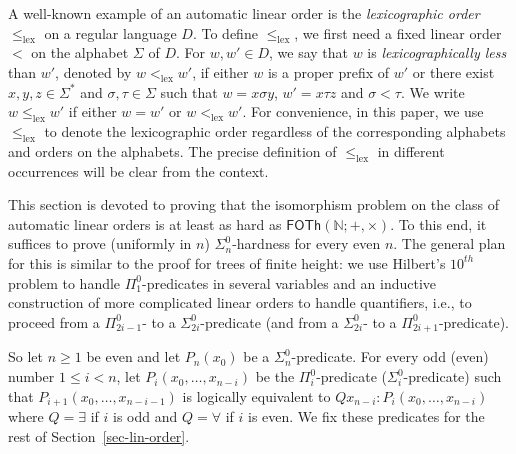 \documentclass[envcountsame]{llncs}
\newcommand{\FOTh}{\mathsf{FOTh}}
\newcommand{\lex}{\mathrm{lex}}
\newcommand{\N}{\mathbb N}
\begin{document}
A well-known example of an automatic linear order is the {\em
  lexicographic order} $\leq_{\lex}$ on a regular language $D$. To
define $\leq_{\lex}$, we first need a fixed linear order $<$ on the
alphabet $\Sigma$ of $D$. For $w,w'\in D$, we say that $w$ is {\em
  lexicographically less} than $w'$, denoted by $w<_{\lex} w'$, if
either $w$ is a proper prefix of $w'$ or there exist $x,y,z\in
\Sigma^*$ and $\sigma, \tau\in \Sigma$ such that $w=x\sigma y$,
$w'=x\tau z$ and $\sigma< \tau$. We write $w\leq_{\lex} w'$ if either
$w=w'$ or $w<_{\lex} w'$.  For convenience, in this paper, we use
$\leq_{\lex}$ to denote the lexicographic order regardless of the
corresponding alphabets and orders on the alphabets.  The precise
definition of $\leq_{\lex}$ in different occurrences will be clear
from the context.

This section is devoted to proving that the isomorphism problem on the
class of automatic linear orders is at least as hard as $\FOTh(\N;+,\times)$.
To this end, it suffices to prove (uniformly in $n$) $\Sigma^0_n$-hardness for
every even $n$. The general plan for this is similar to the proof for trees
of finite height: we use Hilbert's $10^{th}$ problem to handle
$\Pi^0_1$-predicates in several variables and an inductive
construction of more complicated linear orders to handle quantifiers,
i.e., to proceed from a $\Pi^0_{2i-1}$- to a $\Sigma^0_{2i}$-predicate
(and from a $\Sigma^0_{2i}$- to a $\Pi^0_{2i+1}$-predicate).

So let $n\ge1$ be even and let $P_n(x_0)$ be a
$\Sigma^0_n$-predicate. For every odd (even) number
$1\leq i< n$, let $P_i(x_0, \ldots, x_{n-i})$ be the
$\Pi^0_i$-predicate ($\Sigma^0_i$-predicate) such that $P_{i+1}(x_0,
\ldots, x_{n-i-1})$ is logically equivalent to $Q x_{n-i}:
P_i(x_0,\ldots, x_{n-i})$ where $Q=\exists$ if $i$ is odd and
$Q=\forall$ if $i$ is even.  We fix these predicates for the rest of
Section~\ref{sec-lin-order}.
\end{document}
